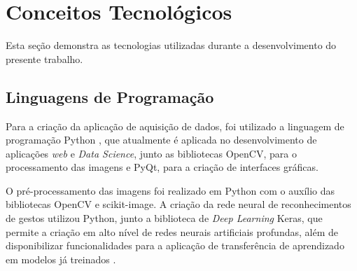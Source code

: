 \section{Conceitos Tecnológicos}

Esta seção demonstra as tecnologias utilizadas durante a desenvolvimento do presente trabalho.

\subsection{Linguagens de Programação}




\par Para a criação da aplicação de aquisição de dados, foi utilizado a linguagem de programação Python \cite{Python2019}, que atualmente é aplicada no desenvolvimento de aplicações \textit{web} e \textit{Data Science}, junto as bibliotecas OpenCV, para o processamento das imagens e PyQt, para a criação de interfaces gráficas.

\par O pré-processamento das imagens foi realizado em Python com o auxílio das bibliotecas OpenCV e scikit-image. A criação da rede neural de reconhecimentos de gestos utilizou Python, junto a biblioteca de \textit{Deep Learning} Keras, que permite a criação em alto nível de redes neurais artificiais profundas, além de disponibilizar funcionalidades para a aplicação de transferência de aprendizado em modelos já treinados \cite{chollet2015}.

